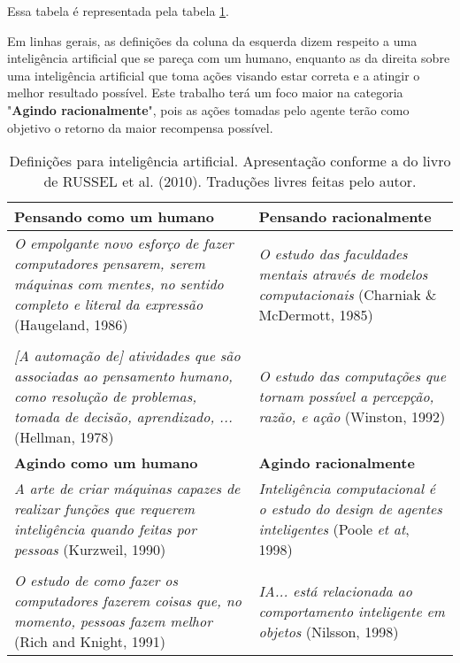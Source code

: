 Essa tabela é representada pela tabela \ref{table:1}.

Em linhas gerais, as definições da coluna da esquerda dizem respeito a uma inteligência artificial que se pareça com um humano, enquanto as da direita sobre uma inteligência artificial que toma ações visando estar correta e a atingir o melhor resultado possível. Este trabalho terá um foco maior na categoria "\textbf{Agindo racionalmente}", pois as ações tomadas pelo agente terão como objetivo o retorno da maior recompensa possível.

\begin{table}
\centering
\begin{tabular}{| p{7cm} | p{7cm} |}
  \hline
  \textbf{Pensando como um humano} & \textbf{Pensando racionalmente} \\ \hline
  \textit{O empolgante novo esforço de fazer computadores pensarem, serem máquinas com mentes, no sentido completo e literal da expressão} \newline (Haugeland, 1986) & \textit{O estudo das faculdades mentais através de modelos computacionais} \newline (Charniak \& McDermott, 1985) \\ & \\ \textit{[A automação de] atividades que são associadas ao pensamento humano, como resolução de problemas, tomada de decisão, aprendizado, ...} \newline (Hellman, 1978) & \textit{O estudo das computações que tornam possível a percepção, razão, e ação} \newline (Winston, 1992) \\ \hline
  \textbf{Agindo como um humano} & \textbf{Agindo racionalmente} \\ \hline
  \textit{A arte de criar máquinas capazes de realizar funções que requerem inteligência quando feitas por pessoas} \newline (Kurzweil, 1990) & \textit{Inteligência computacional é o estudo do design de agentes inteligentes} \newline (Poole \textit{et at}, 1998) \\ & \\ \textit{O estudo de como fazer os computadores fazerem coisas que, no momento, pessoas fazem melhor} \newline (Rich and Knight, 1991) & \textit{IA... está relacionada ao comportamento inteligente em objetos} \newline (Nilsson, 1998) \\ \hline
\end{tabular}
\caption{Definições para inteligência artificial. Apresentação conforme a do livro de RUSSEL et al. (2010). Traduções livres feitas pelo autor.}
\label{table:1}
\end{table}

